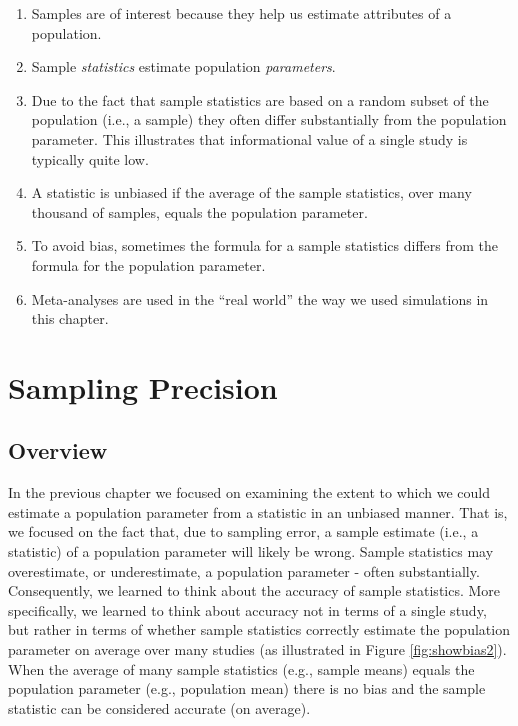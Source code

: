\documentclass[
]{krantz}
\begin{document}
\begin{enumerate}
\def\labelenumi{\arabic{enumi}.}
\item
  Samples are of interest because they help us estimate attributes of a population.
\item
  Sample \emph{statistics} estimate population \emph{parameters}.
\item
  Due to the fact that sample statistics are based on a random subset of the population (i.e., a sample) they often differ substantially from the population parameter. This illustrates that informational value of a single study is typically quite low.
\item
  A statistic is unbiased if the average of the sample statistics, over many thousand of samples, equals the population parameter.
\item
  To avoid bias, sometimes the formula for a sample statistics differs from the formula for the population parameter.
\item
  Meta-analyses are used in the ``real world'' the way we used simulations in this chapter.
\end{enumerate}

\hypertarget{sampling-precision}{%
\chapter{Sampling Precision}\label{sampling-precision}}

\hypertarget{overview-2}{%
\section{Overview}\label{overview-2}}

In the previous chapter we focused on examining the extent to which we could estimate a population parameter from a statistic in an unbiased manner. That is, we focused on the fact that, due to sampling error, a sample estimate (i.e., a statistic) of a population parameter will likely be wrong. Sample statistics may overestimate, or underestimate, a population parameter - often substantially. Consequently, we learned to think about the accuracy of sample statistics. More specifically, we learned to think about accuracy not in terms of a single study, but rather in terms of whether sample statistics correctly estimate the population parameter on average over many studies (as illustrated in Figure \ref{fig:showbias2}). When the average of many sample statistics (e.g., sample means) equals the population parameter (e.g., population mean) there is no bias and the sample statistic can be considered accurate (on average).
\end{document}
